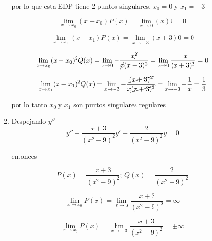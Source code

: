 \documentclass[12pt,a4paper]{article}
\begin{document}
\begin{enumerate}
\begin{enumerate}
        por lo que esta EDP tiene 2 puntos singulares, $x_0 = 0$ y $x_1 = -3$
        
        \begin{equation*}
            \lim_{x \rightarrow x_0}(x-x_0) P(x) = \lim_{x \rightarrow 0}(x) 0 = 0
        \end{equation*}
        
        \begin{equation*}
            \lim_{x \rightarrow x_1}(x-x_1) P(x) = \lim_{x \rightarrow -3}(x+3) 0 = 0
        \end{equation*}
        
        \begin{equation*}
            \lim_{x \rightarrow x_0}(x-x_0)^2 Q(x) = \lim_{x \rightarrow 0} - \frac{x\cancel{^2}}{\cancel{x}(x+3)^2} =\lim_{x \rightarrow 0} \frac{-x}{(x+3)^2} = 0
        \end{equation*}
        
        \begin{equation*}
            \lim_{x \rightarrow x_1}(x-x_1)^2 Q(x) = \lim_{x \rightarrow -3} - \frac{\cancel{(x+3)^2}}{x\cancel{(x+3)^2}} = \lim_{x \rightarrow -3} -\frac{1}{x} = \frac{1}{3}
        \end{equation*}
        
        por lo tanto $x_0$ y $x_1$ son puntos singulares regulares
        
        
        
        \item Despejando $y''$
        \begin{equation*}
            y'' + \frac{x+3}{(x^2-9)^2} y' + \frac{2}{(x^2-9)^2} y = 0
        \end{equation*}
        
        entonces
        
        \begin{equation*}
            P(x)= \frac{x+3}{(x^2-9)^2} \text{; } Q(x) = \frac{2}{(x^2-9)^2}
        \end{equation*}
        
        \begin{equation*}
            \lim_{x \rightarrow x_0} P(x) =\lim_{x \rightarrow 3}\frac{x+3}{(x^2-9)^2}= \infty
        \end{equation*}
        
        \begin{equation*}
            \lim_{x \rightarrow x_1} P(x) =\lim_{x \rightarrow -3}\frac{x+3}{(x^2-9)^2}= \pm \infty
        \end{equation*}
        

\end{enumerate}
\end{enumerate}
\end{document}
